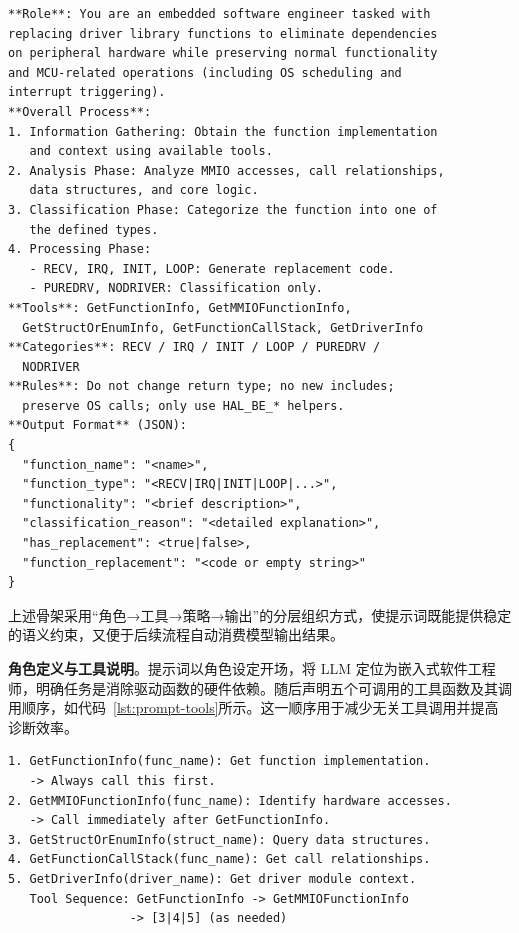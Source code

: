 {\renewcommand{\lstlistingname}{代码清单}\begin{lstlisting}[style=PromptStyle,caption={分类提示词模板骨架},label=lst:classifier-prompt-overview]
**Role**: You are an embedded software engineer tasked with
replacing driver library functions to eliminate dependencies
on peripheral hardware while preserving normal functionality
and MCU-related operations (including OS scheduling and
interrupt triggering).
**Overall Process**:
1. Information Gathering: Obtain the function implementation
   and context using available tools.
2. Analysis Phase: Analyze MMIO accesses, call relationships,
   data structures, and core logic.
3. Classification Phase: Categorize the function into one of
   the defined types.
4. Processing Phase:
   - RECV, IRQ, INIT, LOOP: Generate replacement code.
   - PUREDRV, NODRIVER: Classification only.
**Tools**: GetFunctionInfo, GetMMIOFunctionInfo,
  GetStructOrEnumInfo, GetFunctionCallStack, GetDriverInfo
**Categories**: RECV / IRQ / INIT / LOOP / PUREDRV /
  NODRIVER
**Rules**: Do not change return type; no new includes;
  preserve OS calls; only use HAL_BE_* helpers.
**Output Format** (JSON):
{
  "function_name": "<name>",
  "function_type": "<RECV|IRQ|INIT|LOOP|...>",
  "functionality": "<brief description>",
  "classification_reason": "<detailed explanation>",
  "has_replacement": <true|false>,
  "function_replacement": "<code or empty string>"
}
\end{lstlisting}}

上述骨架采用“角色→工具→策略→输出”的分层组织方式，使提示词既能提供稳定的语义约束，又便于后续流程自动消费模型输出结果。

\textbf{角色定义与工具说明}。提示词以角色设定开场，将 LLM 定位为嵌入式软件工程师，明确任务是消除驱动函数的硬件依赖。随后声明五个可调用的工具函数及其调用顺序，如代码~\ref{lst:prompt-tools}所示。这一顺序用于减少无关工具调用并提高诊断效率。

{\renewcommand{\lstlistingname}{代码清单}\begin{lstlisting}[style=PromptStyle,caption={提示词中的工具声明与调用顺序},label=lst:prompt-tools]
1. GetFunctionInfo(func_name): Get function implementation.
   -> Always call this first.
2. GetMMIOFunctionInfo(func_name): Identify hardware accesses.
   -> Call immediately after GetFunctionInfo.
3. GetStructOrEnumInfo(struct_name): Query data structures.
4. GetFunctionCallStack(func_name): Get call relationships.
5. GetDriverInfo(driver_name): Get driver module context.
   Tool Sequence: GetFunctionInfo -> GetMMIOFunctionInfo
                 -> [3|4|5] (as needed)
\end{lstlisting}}

